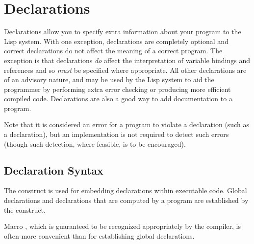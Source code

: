 
\clearpage\def\pagestatus{ULTIMATE}

\ifx \rulang\Undef

\chapter{Declarations}
\label{DECLAR}

Declarations allow you to specify extra information about your program
to the Lisp system.  With one exception,
declarations are completely optional
and correct declarations do not affect the meaning
of a correct program.  The exception is that
 declarations \emph{do} affect the interpretation of variable
bindings and references and so \emph{must} be specified where appropriate.
All other declarations are of an advisory nature, and may be used
by the Lisp system to aid the programmer by performing extra error checking
or producing more efficient compiled code.  Declarations are also
a good way to add documentation to a program.

Note that it is considered an error for a program to violate a
declaration (such as a  declaration), but an implementation is
not required to detect such errors (though such detection, where
feasible, is to be encouraged).

\section{Declaration Syntax}
\label{DECLARE-SYNTAX-SECTION}

The  construct is used for embedding declarations within
executable code.  Global declarations and declarations that are computed
by a program are established by the  construct.

Macro , which is guaranteed
to be recognized appropriately by the compiler, is often more convenient
than  for establishing global declarations.

